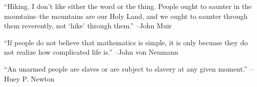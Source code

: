 \documentclass{article}%
\begin{document}
\begin{minipage}{\textwidth}%
\flushleft%
“Hiking. I don't like either the word or the thing. People ought to saunter in the mountains–the mountains are our Holy Land, and we ought to saunter through them reverently, not ‘hike’ through them.”%
\linebreak%
\vspace{1mm}%
–John Muir%
\linebreak%
\vspace{1mm}%
\end{minipage}%
\linebreak%
\vspace{1mm}%
\begin{minipage}{\textwidth}%
\flushleft%
“If people do not believe that mathematics is simple, it is only becuase they do not realize how complicated life is.”%
\linebreak%
\vspace{1mm}%
–John von Neumann%
\linebreak%
\vspace{1mm}%
\end{minipage}%
\linebreak%
\vspace{1mm}%
\begin{minipage}{\textwidth}%
\flushleft%
“An unarmed people are slaves or are subject to slavery at any given moment.”%
\linebreak%
\vspace{1mm}%
–Huey P. Newton%
\linebreak%
\vspace{1mm}%
\end{minipage}%
\linebreak%
\vspace{1mm}%
\end{document}
